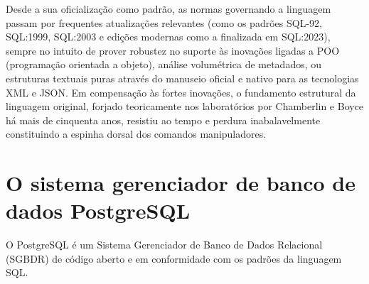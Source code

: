 Desde a sua oficialização como padrão, as normas governando a linguagem passam por frequentes atualizações relevantes (como os padrões SQL-92, SQL:1999, SQL:2003 e edições modernas como a finalizada em SQL:2023), sempre no intuito de prover robustez no suporte às inovações ligadas a POO (programação orientada a objeto), análise volumétrica de metadados, ou estruturas textuais puras através do manuseio oficial e nativo para as tecnologias XML e JSON. Em compensação às fortes inovações, o fundamento estrutural da linguagem original, forjado teoricamente nos laboratórios por Chamberlin e Boyce há mais de cinquenta anos, resistiu ao tempo e perdura inabalavelmente constituindo a espinha dorsal dos comandos manipuladores.

\section{O sistema gerenciador de banco de dados PostgreSQL}

O PostgreSQL é um Sistema Gerenciador de Banco de Dados Relacional (SGBDR) de código aberto e em conformidade com os padrões da linguagem SQL. 

